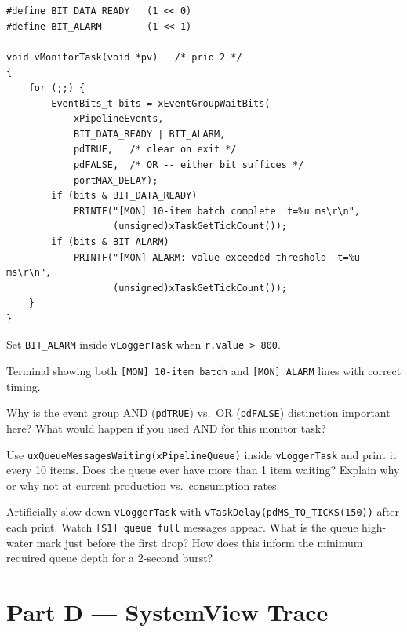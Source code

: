 \documentclass[11pt, a4paper]{article}
\begin{document}
\begin{lstlisting}[style=cstyle]
#define BIT_DATA_READY   (1 << 0)
#define BIT_ALARM        (1 << 1)

void vMonitorTask(void *pv)   /* prio 2 */
{
    for (;;) {
        EventBits_t bits = xEventGroupWaitBits(
            xPipelineEvents,
            BIT_DATA_READY | BIT_ALARM,
            pdTRUE,   /* clear on exit */
            pdFALSE,  /* OR -- either bit suffices */
            portMAX_DELAY);
        if (bits & BIT_DATA_READY)
            PRINTF("[MON] 10-item batch complete  t=%u ms\r\n",
                   (unsigned)xTaskGetTickCount());
        if (bits & BIT_ALARM)
            PRINTF("[MON] ALARM: value exceeded threshold  t=%u ms\r\n",
                   (unsigned)xTaskGetTickCount());
    }
}
\end{lstlisting}

Set \texttt{BIT\_ALARM} inside \texttt{vLoggerTask} when \texttt{r.value > 800}.

\begin{checkpointbox}[~C]
  Terminal showing both \texttt{[MON] 10-item batch} and \texttt{[MON] ALARM} lines
  with correct timing.
\end{checkpointbox}

\begin{questionbox}[~C1]
  Why is the event group AND (\texttt{pdTRUE}) vs.\ OR (\texttt{pdFALSE}) distinction
  important here? What would happen if you used AND for this monitor task?
\end{questionbox}

\begin{questionbox}[~C2]
  Use \texttt{uxQueueMessagesWaiting(xPipelineQueue)} inside \texttt{vLoggerTask} and
  print it every 10 items. Does the queue ever have more than 1 item waiting? Explain
  why or why not at current production vs.\ consumption rates.
\end{questionbox}

\begin{questionbox}[~C3]
  Artificially slow down \texttt{vLoggerTask} with
  \texttt{vTaskDelay(pdMS\_TO\_TICKS(150))} after each print. Watch
  \texttt{[S1] queue full} messages appear. What is the queue high-water mark just
  before the first drop? How does this inform the minimum required queue depth for a
  2-second burst?
\end{questionbox}

\section{Part D --- SystemView Trace}
\end{document}
